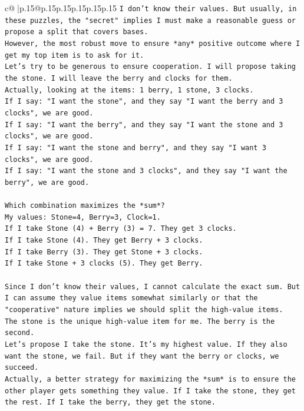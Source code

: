 \documentclass{article}
\begin{document}
{\begin{supertabular}{c@{$\;$}|p{.15\linewidth}@{}p{.15\linewidth}p{.15\linewidth}p{.15\linewidth}p{.15\linewidth}p{.15\linewidth}}
{{{\texttt{I don't know their values. But usually, in these puzzles, the "secret" implies I must make a reasonable guess or propose a split that covers bases.} \\
\texttt{However, the most robust move to ensure *any* positive outcome where I get my top item is to ask for it.} \\
\texttt{Let's try to be generous to ensure cooperation. I will propose taking the stone. I will leave the berry and clocks for them.} \\
\texttt{Actually, looking at the items: 1 berry, 1 stone, 3 clocks.} \\
\texttt{If I say: "I want the stone", and they say "I want the berry and 3 clocks", we are good.} \\
\texttt{If I say: "I want the berry", and they say "I want the stone and 3 clocks", we are good.} \\
\texttt{If I say: "I want the stone and berry", and they say "I want 3 clocks", we are good.} \\
\texttt{If I say: "I want the stone and 3 clocks", and they say "I want the berry", we are good.} \\
\\ 
\texttt{Which combination maximizes the *sum*?} \\
\texttt{My values: Stone=4, Berry=3, Clock=1.} \\
\texttt{If I take Stone (4) + Berry (3) = 7. They get 3 clocks.} \\
\texttt{If I take Stone (4). They get Berry + 3 clocks.} \\
\texttt{If I take Berry (3). They get Stone + 3 clocks.} \\
\texttt{If I take Stone + 3 clocks (5). They get Berry.} \\
\\ 
\texttt{Since I don't know their values, I cannot calculate the exact sum. But I can assume they value items somewhat similarly or that the "cooperative" nature implies we should split the high{-}value items.} \\
\texttt{The stone is the unique high{-}value item for me. The berry is the second.} \\
\texttt{Let's propose I take the stone. It's my highest value. If they also want the stone, we fail. But if they want the berry or clocks, we succeed.} \\
\texttt{Actually, a better strategy for maximizing the *sum* is to ensure the other player gets something they value. If I take the stone, they get the rest. If I take the berry, they get the stone.} \\
}}}
\end{supertabular}}
\end{document}
